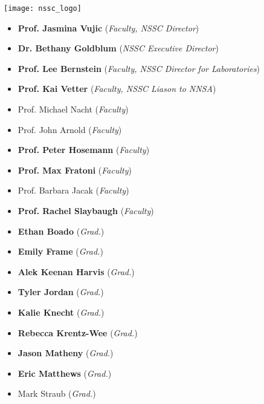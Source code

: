 \begin{minipage}{0.2\textwidth}
	\begin{center}
		\texttt{[image: nssc\_logo]}
	\end{center}
\end{minipage}
\hfill
\begin{minipage}{0.8\textwidth}
	\vspace{1cm}{\Large Members from UC Berkeley}\vspace{0.5cm}

	\newcommand{\nsscmember}[2]{#1 (\textit{#2})}
	\newcommand{\nensscmember}[2]{\nsscmember{\textbf{#1}}{#2}}
	\begin{itemize}
		\item \nensscmember{Prof. Jasmina Vujic}{Faculty, NSSC Director}
		\item \nensscmember{Dr. Bethany Goldblum}{NSSC Executive Director}
		\item \nensscmember{Prof. Lee Bernstein}{Faculty, NSSC Director for Laboratories}
		\item \nensscmember{Prof. Kai Vetter}{Faculty, NSSC Liason to NNSA}
		\item \nsscmember{Prof. Michael Nacht}{Faculty}
		\item \nsscmember{Prof. John Arnold}{Faculty}
		\item \nensscmember{Prof. Peter Hosemann}{Faculty}
		\item \nensscmember{Prof. Max Fratoni}{Faculty}
		\item \nsscmember{Prof. Barbara Jacak}{Faculty}
		\item \nensscmember{Prof. Rachel Slaybaugh}{Faculty}
	\end{itemize}
	\begin{multicols}{2}
		\begin{itemize}
			\item \nensscmember{Ethan Boado}{Grad.}
			\item \nensscmember{Emily Frame}{Grad.}
			\item \nensscmember{Alek Keenan Harvis}{Grad.}
			\item \nensscmember{Tyler Jordan}{Grad.}
			\item \nensscmember{Kalie Knecht}{Grad.}
			\item \nensscmember{Rebecca Krentz-Wee}{Grad.}
			\item \nensscmember{Jason Matheny}{Grad.}
			\item \nensscmember{Eric Matthews}{Grad.}
			\item \nsscmember{Mark Straub}{Grad.}

\end{itemize}
\end{multicols}
\end{minipage}
